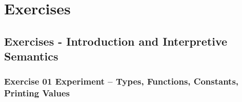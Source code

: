 \documentclass[10.5pt,a4]{article}
\begin{document}
\begin{comment}
\subsection{Petrol Types.mo}


\subsection{Petrol Main.mo}


\subsection{Petrol Parse.mo}


\lstset{language=}
\subsection{Petrol lexerPetrol.c}


\subsection{Petrol lexerPetrol.h}


\subsection{Petrol parser.y}


\subsection{Petrol Makefile}

\lstset{language=modelica}
\end{comment}

\section{Exercises}

\subsection{Exercises - Introduction and Interpretive Semantics}

\subsubsection{Exercise 01 Experiment – Types, Functions, Constants, Printing Values}

\end{document}

